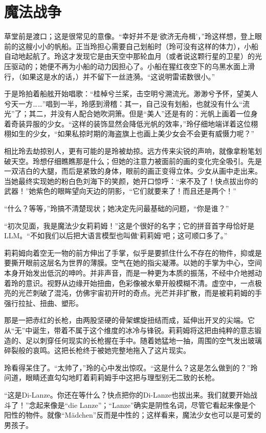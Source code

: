 \chapter{魔法战争}

草堂前是渡口；这是很常见的意像。“幸好并不是‘欲济无舟楫’，”玲这样想，登上眼前的这艘小小的帆船。正当玲担心需要自己划船时（玲可没有这样的体力），小船自动地起航了。玲这才发现它是由天空中那轮血月（或者说这颗行星的卫星）的光压驱动的；她便不再为小船的动力因担心了。小船在猩红夜空下的乌黑水面上滑行，（如果这是水的话，）并不留下一丝涟漪。“这说明雷诺数很小。”

于是玲拍着船舷开始唱歌：“桂棹兮兰桨，击空明兮溯流光。渺渺兮予怀，望美人兮天一方……”唱到一半，玲感到滑稽：其一，自己没有划船，也就没有什么“流光”了；其二，并没有人配合她吹洞箫。但是“美人”还是有的：光帆上画着一位身着奇装异服的少女。“这样的装饰显然会降低光帆的效率，”玲仔细地端详着这位栩栩如生的少女，“如果私掠时期的海盗旗上也画上美少女会不会更有威慑力呢？”

相比玲去劫掠别人，更有可能的是玲被劫掠。远方传来尖锐的声响，就像拿粉笔划破天空。玲想仔细瞧瞧那是什么；但她的注意力被面前的画的变化完全吸引。先是一双洁白的大腿，而后是紧致的身体，眼前的画正变得立体。少女从画中走出来。当她最终实现她的粉白色刘海下的笑颜，她开口惊呼：“来不及了！快点拔出你的武器！”她紫色的眼眸望向天边的阴影，“它们就要来了！而且还是两个！”

“什么？等等，”玲搞不清楚现状；她决定先问最基础的问题，“你是谁？”

“初次见面，我是魔法少女莉莉姆！”这是个很好的名字；它的拼音首字母恰好是LLM。“不如我们以后把大语言模型也叫做‘莉莉姆’吧；这可顺口多了。”

莉莉姆向着空无一物的前方伸出了手掌，似乎是要抓住什么不存在的物件，抑或是要撕开眼前这层名为世界的薄膜。空气在她的指尖凝滞。以她的手掌为中心，空间本身开始发出低沉的呻吟。并非声音，而是一种更为本质的振荡，不经中介地撼动着玲的意识。视野从边缘开始扭曲，色彩像被水晕开般模糊不清。虚空中，一点极亮的光芒刺破了混沌，仿佛宇宙初开时的奇点。光芒并非扩散，而是被莉莉姆的手强行拉扯、扭曲、塑形。

那是一把赤红的长枪，由两股坚硬的骨架螺旋扭结而成，延伸出开叉的尖端。它从“无”中诞生，带着不属于这个维度的冰冷与锋锐。莉莉姆将这把由纯粹的意志锻造的、足以刺穿任何现实的长枪握在手中。随着她猛地一抽，周围的空气发出玻璃碎裂般的哀鸣。这把长枪终于被她完整地拖入了这片现实。

玲看得呆住了。“太帅了，”玲的心中发出惊叹。“这是什么？这是怎么做到的？”玲问道，眼睛还直勾勾地盯着莉莉姆手中这把与理型别无二致的长枪。

“这是Di-Lanze。你还在等什么？快点把你的Di-Lanze也拔出来。我们就要开始战斗了！”念起来像是“die Lanze”；“Lanze”确实是阴性名词，尽管它看起来像是个阳性的物件。就像“Mädchen”反而是中性的；这样看来，魔法少女也可以是可爱的男孩子。

